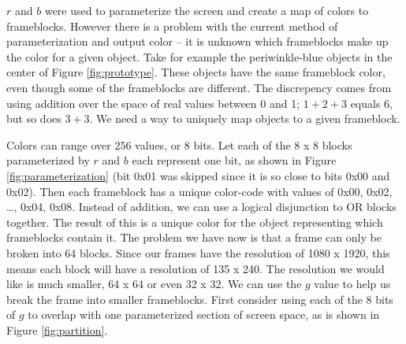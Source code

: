 \documentclass[conference]{IEEEtran}
\begin{document}
$r$ and $b$ were used to parameterize the screen
and create a map of colors to frameblocks.
However there is a problem with the current method of parameterization
and output color -- it is unknown which frameblocks make up the color
for a given object. Take for example the periwinkle-blue objects in the center of
Figure \ref{fig:prototype}. These objects have the same frameblock color, even though
some of the frameblocks are different.
The discrepency comes from using addition over the space of real values between 0 and 1;
$1 + 2 + 3$ equals $6$, but so does $3 + 3$. We need a way to uniquely map objects to a given frameblock.

Colors can range over 256 values, or 8 bits.
Let each of the 8 x 8 blocks parameterized by $r$ and $b$ each represent one bit,
as shown in Figure \ref{fig:parameterization}
(bit 0x01 was skipped since it is so close to bits 0x00 and 0x02).
Then each frameblock has a unique color-code with values of 0x00, 0x02, \dots, 0x04, 0x08.
Instead of addition, we can use a logical disjunction to OR blocks together.
The result of this is a unique color for the object representing which frameblocks contain it.
The problem we have now is that a frame can only be broken into 64 blocks.
Since our frames have the resolution of 1080 x 1920, this means each block will have
a resolution of 135 x 240. The resolution we would like is much smaller, 64 x 64
or even 32 x 32.
We can use the $g$ value to help us break the frame into smaller frameblocks.
First consider using each of the 8 bits of $g$ to overlap with one parameterized section of screen space,
as is shown in Figure \ref{fig:partition}.
\end{document}
